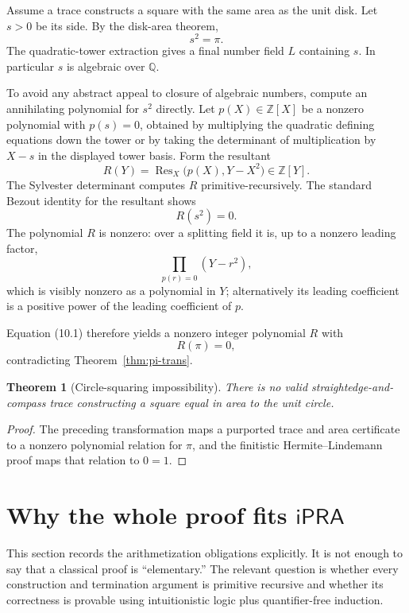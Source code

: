 \documentclass[11pt]{article}
\newtheorem{theorem}{Theorem}[section]
\newcommand{\Q}{\mathbb{Q}}
\newcommand{\Z}{\mathbb{Z}}
\newcommand{\ipra}{\mathsf{iPRA}}
\newcommand{\Res}{\operatorname{Res}}
\begin{document}
Assume a trace constructs a square with the same area as the unit disk.  Let $s>0$ be its side.  By the disk-area theorem,
\[
  s^2=\pi.                                                  \tag{10.1}
\]
The quadratic-tower extraction gives a final number field $L$ containing $s$.  In particular $s$ is algebraic over $\Q$.

To avoid any abstract appeal to closure of algebraic numbers, compute an annihilating polynomial for $s^2$ directly.  Let $p(X)\in\Z[X]$ be a nonzero polynomial with $p(s)=0$, obtained by multiplying the quadratic defining equations down the tower or by taking the determinant of multiplication by $X-s$ in the displayed tower basis.  Form the resultant
\[
  R(Y)=\Res_X\bigl(p(X),Y-X^2\bigr)\in\Z[Y].
\]
The Sylvester determinant computes $R$ primitive-recursively.  The standard Bezout identity for the resultant shows
\[
  R(s^2)=0.
\]
The polynomial $R$ is nonzero: over a splitting field it is, up to a nonzero leading factor,
\[
  \prod_{p(r)=0}(Y-r^2),
\]
which is visibly nonzero as a polynomial in $Y$; alternatively its leading coefficient is a positive power of the leading coefficient of $p$.

Equation (10.1) therefore yields a nonzero integer polynomial $R$ with
\[
  R(\pi)=0,
\]
contradicting Theorem~\ref{thm:pi-trans}.

\begin{theorem}[Circle-squaring impossibility]
There is no valid straightedge-and-compass trace constructing a square equal in area to the unit circle.
\end{theorem}

\begin{proof}
The preceding transformation maps a purported trace and area certificate to a nonzero polynomial relation for $\pi$, and the finitistic Hermite--Lindemann proof maps that relation to $0=1$.
\end{proof}

\section{Why the whole proof fits $\ipra$}

This section records the arithmetization obligations explicitly.  It is not enough to say that a classical proof is ``elementary.''  The relevant question is whether every construction and termination argument is primitive recursive and whether its correctness is provable using intuitionistic logic plus quantifier-free induction.
\end{document}
